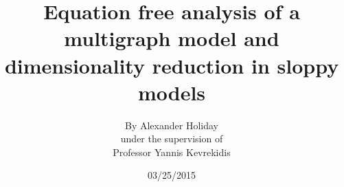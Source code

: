 \documentclass[12pt]{article}
\begin{document}
\title{\vspace{-1cm}Equation free analysis of a multigraph model and dimensionality reduction in sloppy models}
\author{\LARGE By Alexander Holiday\vspace{3mm}\\\Large  under the supervision of\vspace{3mm}\\\LARGE  Professor Yannis Kevrekidis}
\date{03/25/2015}

\end{document}
